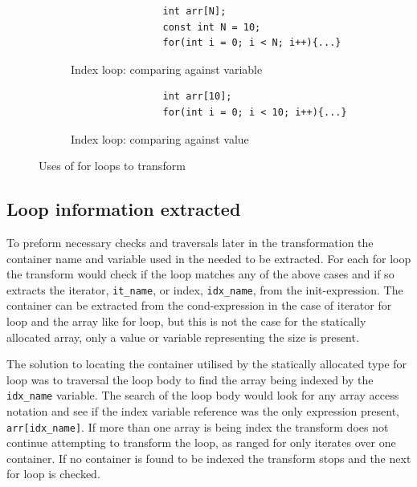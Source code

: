 \documentclass[bsc,frontabs,singlespacing,parskip,deptreport]{infthesis}
\begin{document}
\begin{figure}[h]
    \centering
    \begin{subfigure}[h]{\textwidth}
        \centering
        \begin{verbatim}
                int arr[N];
                const int N = 10;
                for(int i = 0; i < N; i++){...}
        \end{verbatim}
        \caption{Index loop: comparing against variable}
        \label{fig:code-static-for-cmp-var}
        \vspace{0.40cm}
    \end{subfigure}

    \begin{subfigure}[h]{\textwidth}
    \begin{verbatim}
                int arr[10];
                for(int i = 0; i < 10; i++){...}
    \end{verbatim}
    \caption{Index loop: comparing against value}
    \centering
    \label{fig:code-static-for-cmp-num}
    \end{subfigure}

    \caption{Uses of for loops to transform}
    \label{fig:code-static-for-cm}
\end{figure}




\subsection{Loop information extracted}
To preform necessary checks and traversals later in the transformation the container name and variable used in the needed to be extracted. For each for loop the transform would check if the loop matches any of the above cases and if so extracts the iterator, \texttt{it\_name}, or index,  \texttt{idx\_name}, from the init-expression. The container can be extracted from the cond-expression in the case of iterator for loop and the array like for loop, but this is not the case for the statically allocated array, only a value or variable representing the size is present. 

The solution to locating the container utilised by the statically allocated type for loop was to traversal the loop body to find the array being indexed by the \texttt{idx\_name} variable. The search of the loop body would look for any array access notation and see if the index variable reference was the only expression present, \texttt{arr[idx\_name]}. If more than one array is being index the transform does not continue attempting to transform the loop, as ranged for only iterates over one container. If no container is found to be indexed the transform stops and the next for loop is checked.
\end{document}
